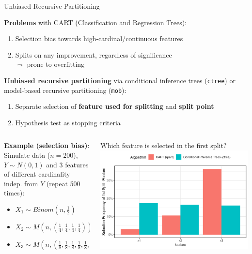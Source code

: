 \documentclass[10pt,compress,t,notes=noshow, xcolor=table]{beamer}
\begin{document}
\begin{frame}{Unbiased Recursive Partitioning}  
\vspace{-0.2cm}

\vspace{0.2cm}
\textbf{Problems} with CART (Classification and Regression Trees): 

\begin{enumerate}
    \item Selection bias towards high-cardinal/continuous features 
    \item Splits on any improvement, regardless of significance \\$\leadsto$ prone to overfitting
\end{enumerate}
\smallskip
\pause
\textbf{Unbiased recursive partitioning} via conditional inference trees (\texttt{ctree}) or model-based recursive partitioning (\texttt{mob}): 
\begin{enumerate}  
  \item Separate selection of \textbf{feature used for splitting} and \textbf{split point}
  \item Hypothesis test as stopping criteria 
\end{enumerate}
\pause
\begin{columns}[T, totalwidth = \textwidth]
    \begin{column}{0.5\textwidth}
    \textbf{Example (selection bias)}: \\
         Simulate data ($n=200$), $Y \sim N(0,1)$ and 3 features of different cardinality indep. from $Y$ (repeat 500 times):
\begin{itemize}
    \item $X_1 \sim Binom(n, \frac{1}{2})$
    \item $X_2 \sim M(n, (\frac{1}{4}, \frac{1}{4}, \frac{1}{4}, \frac{1}{4}))$
    \item $X_3 \sim M(n, (\frac{1}{8}, \frac{1}{8}, \frac{1}{8}, \frac{1}{8}, \frac{1}{8}, \frac{1}{8}, \frac{1}{8}, \frac{1}{8}))$
\end{itemize}
    \end{column}
    \begin{column}{0.5\textwidth}
    \scriptsize
    \centering
    Which feature is selected in the first split?
    \includegraphics[width = \textwidth]{figure/selection_bias_simulation_1000.pdf}

\end{column}
\end{columns}
\end{frame}
\end{document}
